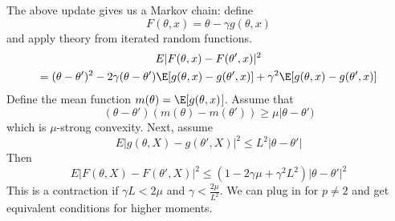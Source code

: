 The above update gives us a Markov chain: define
\[F(\theta, x) = \theta - \gamma g(\theta, x)\]
and apply theory from iterated random functions.
\[\begin{gathered}E |F(\theta, x) - F(\theta', x)|^2 \\
= (\theta - \theta')^2 - 2\gamma(\theta - \theta')\E[g(\theta, x) - g(\theta', x)] + \gamma^2 \E[g(\theta, x) - g(\theta', x)]\end{gathered}\]
Define the mean function \(m(\theta) = \E[g(\theta, x)\){]}. Assume that
\[(\theta - \theta')(m(\theta) - m(\theta')) \geq \mu|\theta - \theta')\]
which is \(\mu\)-strong convexity. Next, assume
\[E |g(\theta, X) - g(\theta', X)|^2 \leq L^2 |\theta - \theta'|\]
Then
\[E |F(\theta, X) - F(\theta', X)|^2 \leq (1 - 2\gamma \mu + \gamma^2 L^2)|\theta - \theta'|^2\]
This is a contraction if \(\gamma L < 2\mu\) and \(\gamma < \frac{2\mu}{L^2}\). We can plug in for \(p \neq 2\) and get equivalent conditions for higher moments.
